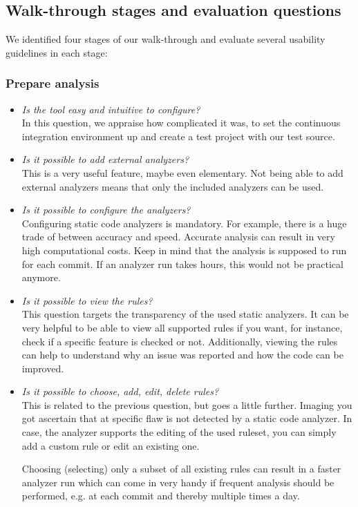 \documentclass[conference]{IEEEtran}
\begin{document}
\subsection{Walk-through stages and evaluation questions}
\label{subsec:walkthrough}

We identified four stages of our walk-through and evaluate several usability guidelines in each stage:

\subsubsection{Prepare analysis}
\label{subsubsec:evaluation_prepare}
\begin{itemize}
	\item \textit{Is the tool easy and intuitive to configure?} \\
	In this question, we appraise how complicated it was, to set the continuous integration environment up and create a test project with our test source.
	
	\item \textit{Is it possible to add external analyzers?} \\
	This is a very useful feature, maybe even elementary. Not being able to add external analyzers means that only the included analyzers can be used.
	
	\item \textit{Is it possible to configure the analyzers?} \\
	Configuring static code analyzers is mandatory. For example, there is a huge trade of between accuracy and speed. Accurate analysis can result in very high computational costs. Keep in mind that the analysis is supposed to run for each commit. If an analyzer run takes hours, this would not be practical anymore.
	
	\item \textit{Is it possible to view the rules?} \\
	This question targets the transparency of the used static analyzers. It can be very helpful to be able to view all supported rules if you want, for instance, check if a specific feature is checked or not. Additionally, viewing the rules can help to understand why an issue was reported and how the code can be improved.
	
	\item \textit{Is it possible to choose, add, edit, delete rules?} \\
	This is related to the previous question, but goes a little further. Imaging you got ascertain that at specific flaw is not detected by a static code analyzer. In case, the analyzer supports the editing of the used ruleset, you can simply add a custom rule or edit an existing one.
	
	Choosing (selecting) only a subset of all existing rules can result in a faster analyzer run which can come in very handy if frequent analysis should be performed, e.g. at each commit and thereby multiple times a day.
\end{itemize}
\end{document}
